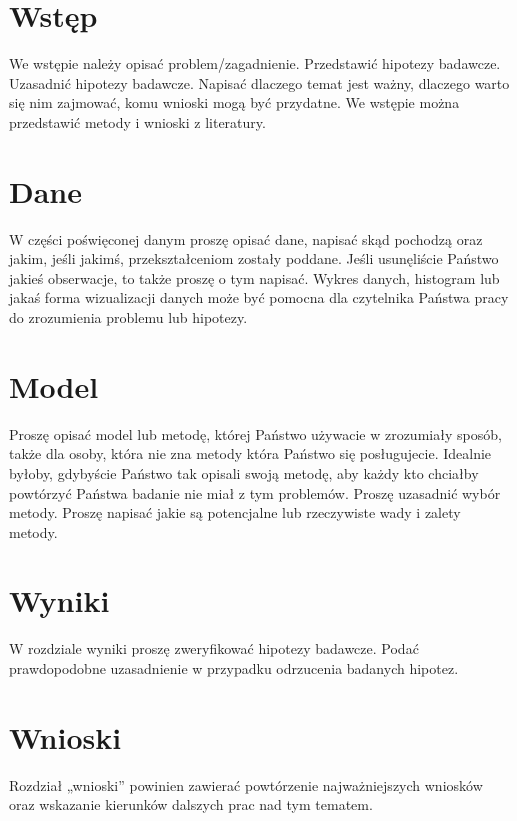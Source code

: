 \documentclass[12pt]{article}
\begin{document}



\tableofcontents
\newpage


\section{Wstęp}
We wstępie należy opisać problem/zagadnienie. Przedstawić hipotezy badawcze. Uzasadnić hipotezy badawcze. Napisać dlaczego temat jest ważny, dlaczego warto się nim zajmować, komu wnioski mogą być przydatne. We wstępie można przedstawić metody i wnioski z literatury.

\section{Dane}
W części poświęconej danym proszę opisać dane, napisać skąd pochodzą oraz jakim, jeśli jakimś, przekształceniom zostały poddane. Jeśli usunęliście Państwo jakieś obserwacje, to także proszę o tym napisać. Wykres danych, histogram lub jakaś forma wizualizacji danych może być pomocna dla czytelnika Państwa pracy do zrozumienia problemu lub hipotezy.

\section{Model}
Proszę opisać model lub metodę, której Państwo używacie w zrozumiały sposób, także dla osoby, która nie zna metody która Państwo się posługujecie. Idealnie byłoby, gdybyście Państwo tak opisali swoją metodę, aby każdy kto chciałby powtórzyć Państwa badanie nie miał z tym problemów. Proszę uzasadnić wybór metody. Proszę napisać jakie są potencjalne lub rzeczywiste wady i zalety metody.

\section{Wyniki}
W rozdziale wyniki proszę zweryfikować hipotezy badawcze. Podać prawdopodobne uzasadnienie w przypadku odrzucenia badanych hipotez.

\section{Wnioski}
Rozdział „wnioski” powinien zawierać powtórzenie najważniejszych wniosków oraz wskazanie kierunków dalszych prac nad tym tematem.
\end{document}
